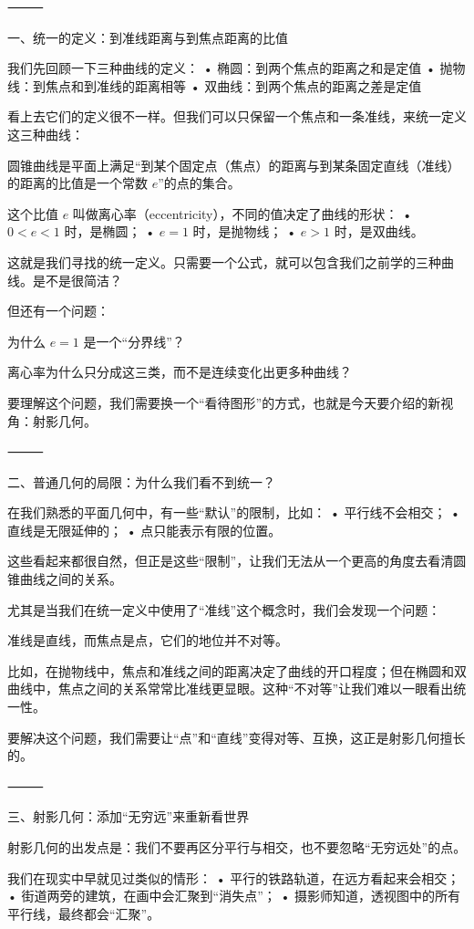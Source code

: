 ⸻

一、统一的定义：到准线距离与到焦点距离的比值

我们先回顾一下三种曲线的定义：
	•	椭圆：到两个焦点的距离之和是定值
	•	抛物线：到焦点和到准线的距离相等
	•	双曲线：到两个焦点的距离之差是定值

看上去它们的定义很不一样。但我们可以只保留一个焦点和一条准线，来统一定义这三种曲线：

圆锥曲线是平面上满足“到某个固定点（焦点）的距离与到某条固定直线（准线）的距离的比值是一个常数 $e$”的点的集合。

这个比值 $e$ 叫做离心率（eccentricity），不同的值决定了曲线的形状：
	•	$0<e<1$ 时，是椭圆；
	•	$e=1$ 时，是抛物线；
	•	$e>1$ 时，是双曲线。

这就是我们寻找的统一定义。只需要一个公式，就可以包含我们之前学的三种曲线。是不是很简洁？

但还有一个问题：

为什么 $e=1$ 是一个“分界线”？

离心率为什么只分成这三类，而不是连续变化出更多种曲线？

要理解这个问题，我们需要换一个“看待图形”的方式，也就是今天要介绍的新视角：射影几何。

⸻

二、普通几何的局限：为什么我们看不到统一？

在我们熟悉的平面几何中，有一些“默认”的限制，比如：
	•	平行线不会相交；
	•	直线是无限延伸的；
	•	点只能表示有限的位置。

这些看起来都很自然，但正是这些“限制”，让我们无法从一个更高的角度去看清圆锥曲线之间的关系。

尤其是当我们在统一定义中使用了“准线”这个概念时，我们会发现一个问题：

准线是直线，而焦点是点，它们的地位并不对等。

比如，在抛物线中，焦点和准线之间的距离决定了曲线的开口程度；但在椭圆和双曲线中，焦点之间的关系常常比准线更显眼。这种“不对等”让我们难以一眼看出统一性。

要解决这个问题，我们需要让“点”和“直线”变得对等、互换，这正是射影几何擅长的。

⸻

三、射影几何：添加“无穷远”来重新看世界

射影几何的出发点是：我们不要再区分平行与相交，也不要忽略“无穷远处”的点。

我们在现实中早就见过类似的情形：
	•	平行的铁路轨道，在远方看起来会相交；
	•	街道两旁的建筑，在画中会汇聚到“消失点”；
	•	摄影师知道，透视图中的所有平行线，最终都会“汇聚”。

